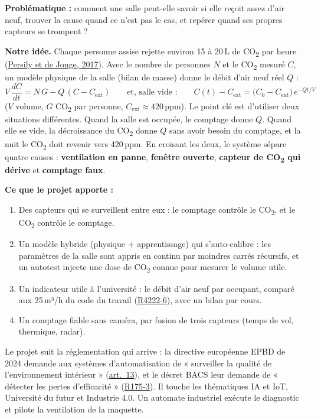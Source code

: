 \documentclass[10pt,a4paper]{article}
\newcommand{\evol}[1]{\textcolor{vertok}{\textbf{#1}}}
\newcommand{\COtwo}{CO\textsubscript{2}}
\begin{document}
\textbf{Problématique :} comment une salle peut-elle savoir si elle reçoit assez d'air neuf, trouver la cause quand ce n'est pas le cas, et repérer quand ses propres capteurs se trompent ?

\textbf{Notre idée.} Chaque personne assise rejette environ 15 à 20\,L de \COtwo{} par heure (\href{https://doi.org/10.1111/ina.12383}{Persily et de Jonge, 2017}). Avec le nombre de personnes $N$ et le \COtwo{} mesuré $C$, un modèle physique de la salle (bilan de masse) donne le débit d'air neuf réel $Q$ :
\[
V\,\frac{dC}{dt} = N\,G - Q\,(C - C_{\text{ext}})
\qquad\text{et, salle vide :}\qquad
C(t) - C_{\text{ext}} = \bigl(C_0 - C_{\text{ext}}\bigr)\,e^{-Q t / V}
\]
($V$ volume, $G$ \COtwo{} par personne, $C_{\text{ext}} \approx 420$\,ppm). Le point clé est d'utiliser deux situations différentes. Quand la salle est occupée, le comptage donne $Q$. Quand elle se vide, la décroissance du \COtwo{} donne $Q$ sans avoir besoin du comptage, et la nuit le \COtwo{} doit revenir vers 420\,ppm. En croisant les deux, le système sépare quatre causes : \evol{ventilation en panne}, \evol{fenêtre ouverte}, \evol{capteur de \COtwo{} qui dérive} et \evol{comptage faux}.

\textbf{Ce que le projet apporte :}
\begin{enumerate}[leftmargin=1.5em,itemsep=1pt,topsep=1pt]
  \item Des capteurs qui se surveillent entre eux : le comptage contrôle le \COtwo, et le \COtwo{} contrôle le comptage.
  \item Un modèle hybride (physique + apprentissage) qui s'auto-calibre : les paramètres de la salle sont appris en continu par moindres carrés récursifs, et un autotest injecte une dose de \COtwo{} connue pour mesurer le volume utile.
  \item Un indicateur utile à l'université : le débit d'air neuf par occupant, comparé aux 25\,m³/h du code du travail (\href{https://www.legifrance.gouv.fr/codes/article_lc/LEGIARTI000018532328}{R4222-6}), avec un bilan par cours.
  \item Un comptage fiable sans caméra, par fusion de trois capteurs (temps de vol, thermique, radar).
\end{enumerate}
Le projet suit la réglementation qui arrive : la directive européenne EPBD de 2024 demande aux systèmes d'automatisation de « surveiller la qualité de l'environnement intérieur » (\href{https://eur-lex.europa.eu/legal-content/FR/TXT/HTML/?uri=OJ:L_202401275}{art.~13}), et le décret BACS leur demande de « détecter les pertes d'efficacité » (\href{https://www.legifrance.gouv.fr/codes/article_lc/LEGIARTI000047427508}{R175-3}). Il touche les thématiques IA et IoT, Université du futur et Industrie 4.0. Un automate industriel exécute le diagnostic et pilote la ventilation de la maquette.
\end{document}
